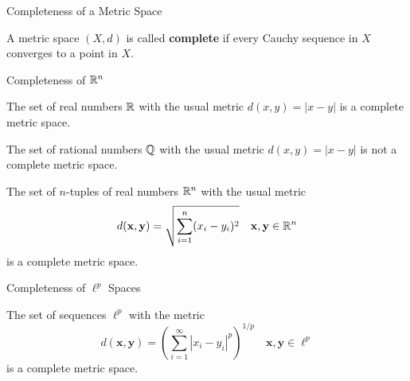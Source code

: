 \documentclass[12pt, a4paper]{article}
\begin{document}
\begin{heading}
    Completeness of a Metric Space
\end{heading}

\vspace{10pt}

\begin{definition}
    A metric space $(X, d)$ is called \textbf{complete} if every Cauchy sequence in $X$ converges to a point in $X$.
\end{definition}

\clearpage

\begin{heading}
    Completeness of $\mathbb{R}^n$
\end{heading}

\vspace{10pt}

\begin{theorem}
    The set of real numbers $\mathbb{R}$ with the usual metric $d(x, y) = |x - y|$ is a complete metric space.
\end{theorem}

\vspace{10pt}

\begin{theorem}
    The set of rational numbers $\mathbb{Q}$ with the usual metric $d(x, y) = |x - y|$ is not a complete metric space.    
\end{theorem}

\vspace{10pt}

\begin{theorem}
    The set of $n$-tuples of real numbers $\mathbb{R}^n$ with the usual metric \[d(\mathbf{x}, \mathbf{y}) = \sqrt{\sum_{i=1}^n (x_i - y_i)^2} \quad \mathbf{x}, \mathbf{y} \in \mathbb{R}^n\] is a complete metric space.
\end{theorem}

\clearpage

\begin{heading}
    Completeness of $\ell^p$ Spaces
\end{heading}

\vspace{10pt}

\begin{theorem}
    The set of sequences $\ell^p$ with the metric \[d(\mathbf{x}, \mathbf{y}) = \left( \sum_{i=1}^\infty |x_i - y_i|^p \right)^{1/p} \quad \mathbf{x}, \mathbf{y} \in \ell^p\] is a complete metric space.
\end{theorem}
\end{document}
